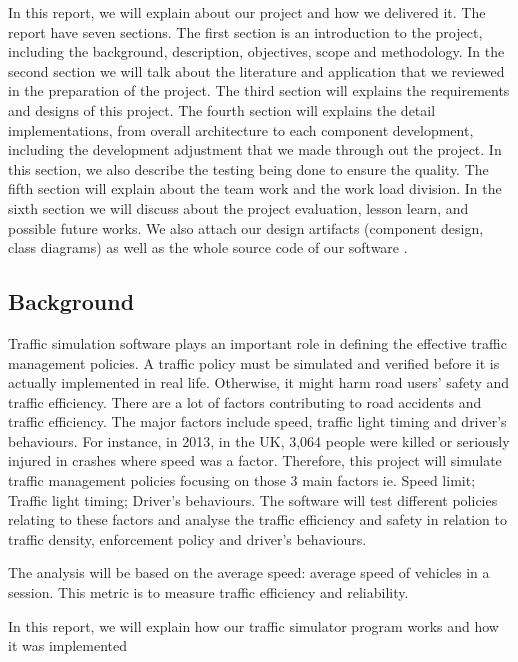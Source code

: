 \documentclass[11pt]{article}
\begin{document}
In this report, we will explain about our project and how we delivered it. The report have seven sections. The first section is an introduction to the project, including the background, description, objectives, scope and methodology. In the second section we will talk about the literature and application that we reviewed in the preparation of the project. The third section will explains the requirements and designs of this project. The fourth section will explains the detail implementations, from overall architecture to each component development, including the development adjustment that we made through out the project. In this section, we also describe the testing being done to ensure the quality. The fifth section will explain about the team work and the work load division. In the sixth section we will discuss about the project evaluation, lesson learn, and possible future works. We also attach our design artifacts (component design, class diagrams) as well as the whole source code of our software . 

\subsection{Background}
Traffic simulation software plays an important role in defining the effective traffic management policies. A traffic policy must be simulated and verified before it is actually implemented in real life. Otherwise, it might harm road users’ safety and traffic efficiency. There are a lot of factors contributing to road accidents and traffic efficiency. The major factors include speed, traffic light timing and driver’s behaviours. For instance, in 2013, in the UK, 3,064 people were killed or seriously injured in crashes where speed was a factor.
Therefore, this project will simulate traffic management policies focusing on those 3 main factors ie. Speed limit; Traffic light timing; Driver's behaviours. The software will test different policies relating to these factors and analyse the traffic efficiency and safety in relation to traffic density, enforcement policy and driver's behaviours.

The analysis will be based on the average speed: average speed of vehicles in a session. This metric is to measure traffic efficiency and reliability.

In this report, we will explain how our traffic simulator program works and how it was implemented
	
\end{document}
